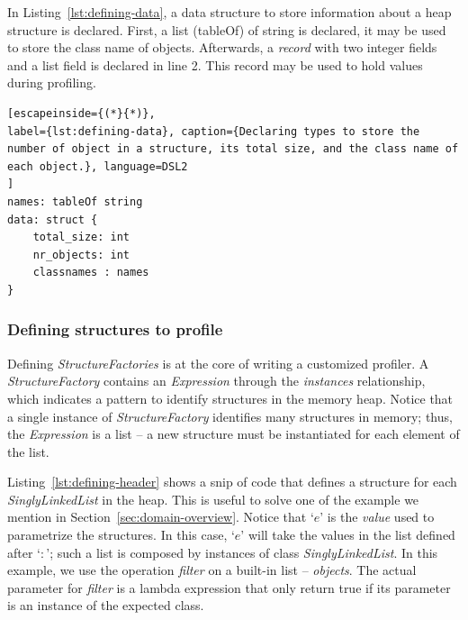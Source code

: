 In Listing~\ref{lst:defining-data}, a data structure to store information about a heap structure is declared.
First, a list (tableOf) of string is declared, it may be used to store the class name of objects.
Afterwards, a \textit{record} with two integer fields and a list field is declared in line 2.
This record may be used to hold values during profiling.

\begin{lstlisting}[escapeinside={(*}{*)}, 
label={lst:defining-data}, caption={Declaring types to store the number of object in a structure, its total size, and the class name of each object.}, language=DSL2
]
names: tableOf string
data: struct {
	total_size: int
	nr_objects: int
	classnames : names
}
\end{lstlisting}

\subsubsection*{Defining structures to profile}
Defining \textit{StructureFactories} is at the core of writing a customized profiler.
A \textit{StructureFactory} contains an \textit{Expression} through the \textit{instances} relationship, which indicates a pattern to identify structures in the memory heap.
Notice that a single instance of \textit{StructureFactory} identifies many structures in memory; thus, the \textit{Expression} is a list -- a new structure must be instantiated for each element of the list.


Listing~\ref{lst:defining-header} shows a snip of code that defines a structure for each \textit{SinglyLinkedList} in the heap.
This is useful to solve one of the example we mention in Section~\ref{sec:domain-overview}.
Notice that `$e$' is the \textit{value} used to parametrize the structures.
In this case, `$e$' will take the values in the list defined after `$:$'; such a list is composed by instances of class \textit{SinglyLinkedList}.
In this example, we use the operation \textit{filter} on a built-in list -- \textit{objects}.
The actual parameter for \textit{filter} is a lambda expression that only return true if its parameter is an instance of the expected class. 

